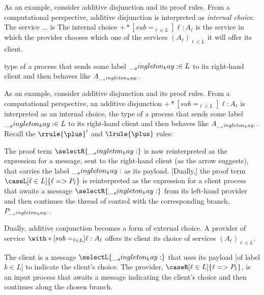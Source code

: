 As an example, consider additive disjunction and its proof rules.
From a computational perspective, additive disjunction is interpreted as \emph{internal choice}.
The service ... is 
The internal choice $\plus*[sub=_{\ell \in L}]{\ell:A_{\ell}}$ is the service in which the provider chooses which one of the services $(A_{\ell})_{\ell \in L}$ it will offer its client.

type of a process that sends some label $\__singleton_kay: \in L$ to its right-hand client and then behaves like $A_{\__singleton_kay:}$.

As an example, consider additive disjunction and its proof rules.
From a computational perspective, an additive disjunction $\plus*[sub=_{\ell \in L}]{\ell:A_{\ell}}$ is interpreted as an internal choice, the type of a process that sends some label $\__singleton_kay: \in L$ to its right-hand client and then behaves like $A_{\__singleton_kay:}$.
Recall the $\rrule{\plus}'$ and $\lrule{\plus}$ rules:
The proof term $\selectR{\kay}$ is now reinterpreted as the expression for a message, sent to the right-hand client (as the arrow suggests), that carries the label $\__singleton_kay:$ as its payload.
[Dually,] the proof term $\caseL[\ell \in L]{\ell => P_{\ell}}$ is reinterpreted as the expression for a client process that awaits a message $\selectR{\kay}$ from its left-hand provider and then continues the thread of control with the corresponding branch, $P_{\__singleton_kay:}$.

Dually, additive conjunction becomes a form of external choice.
A provider of service $\with*[sub=_{\ell \in L}]{\ell:A_{\ell}}$ offers its client its choice of services $(A_{\ell})_{\ell \in L}$.
The client is a message $\selectL{\kay}$ that uses its payload [of label $k \in L$] to indicate the client's choice.
The provider, $\caseR[\ell \in L]{\ell => P_{\ell}}$, is an input process that awaits a message indicating the client's choice and then continues along the chosen branch.

